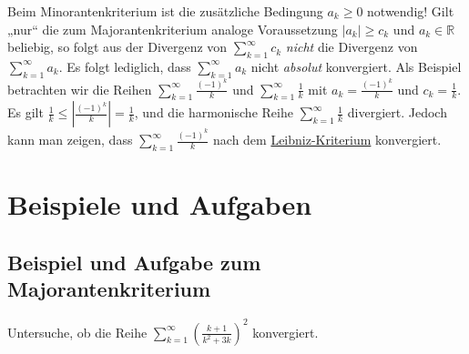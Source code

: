 \documentclass[fontsize=9pt,
               parskip=half-,
               DIV=14,
               listof=chapterentry,
               tocflat]{scrbook}
\begin{document}
\begin{warning*}
Beim Minorantenkriterium ist die zusätzliche Bedingung $a_{k}\geq 0$ notwendig! Gilt „nur“ die zum Majorantenkriterium analoge Voraussetzung $|a_{k}|\geq c_{k}$ und $a_{k}\in \mathbb {R} $ beliebig, so folgt aus der Divergenz von $\sum _{k=1}^{\infty }c_{k}$ \emph{nicht} die Divergenz von $\sum _{k=1}^{\infty }a_{k}$. Es folgt lediglich, dass $\sum _{k=1}^{\infty }a_{k}$ nicht \emph{absolut} konvergiert. Als Beispiel betrachten wir die Reihen $\sum _{k=1}^{\infty }{\tfrac {(-1)^{k}}{k}}$ und $\sum _{k=1}^{\infty }{\tfrac {1}{k}}$ mit $a_{k}={\tfrac {(-1)^{k}}{k}}$ und $c_{k}={\tfrac {1}{k}}$. Es gilt ${\tfrac {1}{k}}\leq \left|{\tfrac {(-1)^{k}}{k}}\right|={\tfrac {1}{k}}$, und die harmonische Reihe $\sum _{k=1}^{\infty }{\tfrac {1}{k}}$ divergiert. Jedoch kann man zeigen, dass $\sum _{k=1}^{\infty }{\tfrac {(-1)^{k}}{k}}$ nach dem \href{https://de.wikibooks.org/wiki/Mathe\_für\_Nicht-Freaks:\_Leibniz-Kriterium}
{Leibniz-Kriterium} konvergiert.

\end{warning*}

\section{Beispiele und Aufgaben}

\subsection{Beispiel und Aufgabe zum Majorantenkriterium}

\begin{exercise*}[Majorantenkriterium]
Untersuche, ob die Reihe $\sum _{k=1}^{\infty }\left({\tfrac {k+1}{k^{2}+3k}}\right)^{2}$ konvergiert.

\end{exercise*}
\end{document}
